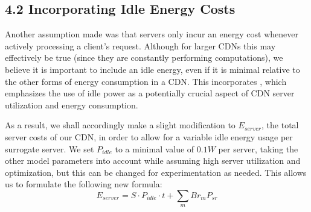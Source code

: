 \documentclass[
	a4paper, %
	10pt, %
	unnumberedsections, %
	twoside, %
]{LTJournalArticle}
\begin{document}
\subsection{4.2 Incorporating Idle Energy Costs}
Another assumption made was that servers only incur an energy cost whenever actively processing a client's request. Although for larger CDNs this may effectively be true (since they are constantly performing computations),  we believe it is important to include an idle energy, even if it is minimal relative to the other forms of energy consumption in a CDN. This incorporates \cite{ulIslam2012}, which emphasizes the use of idle power as a potentially crucial aspect of CDN server utilization and energy consumption.

As a result, we shall accordingly make a slight modification to $E_{server}$, the total server costs of our CDN, in order to allow for a variable idle energy usage per surrogate server. We set $P_{idle}$ to a minimal value of $0.1W$ per server, taking the other model parameters into account while assuming high server utilization and optimization, but this can be changed for experimentation as needed. This allows us to formulate the following new formula:
\[E_{server} = S\cdot P_{idle}\cdot t + \sum_mBr_mP_{sr}\]
\end{document}
